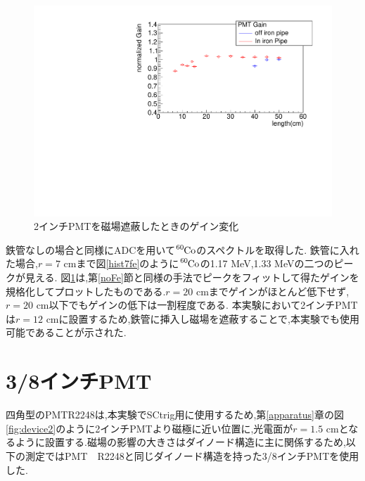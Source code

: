 \begin{figure}[tbp]
	\centering
		\includegraphics[angle=-90,width=15cm]{fig/iguchi/bigPMTfit.pdf}
	\caption{2インチPMTを磁場遮蔽したときのゲイン変化}
	\label{bigPMTfit}
\end{figure}

鉄管なしの場合と同様にADCを用いて$\ce{^{60}Co}$のスペクトルを取得した.
鉄管に入れた場合,$r=7$ cmまで図\ref{hist7fe}のように$\ce{^{60}Co}$の1.17 MeV,1.33 MeVの二つのピークが見える.
図\ref{bigPMTfit}は,第\ref{noFe}節と同様の手法でピークをフィットして得たゲインを規格化してプロットしたものである.$r=20$ cmまでゲインがほとんど低下せず,$r=20$ cm以下でもゲインの低下は一割程度である.
本実験において2インチPMTは$r=12$ cmに設置するため,鉄管に挿入し磁場を遮蔽することで,本実験でも使用可能であることが示された.


\newpage
\section{3/8インチPMT}
四角型のPMT\hspace{3pt}R2248\cite{pmtR2248}は,本実験でSCtrig用に使用するため,第\ref{apparatus}章の図\ref{fig:device2}のように2インチPMTより磁極に近い位置に,光電面が$r=1.5$ cmとなるように設置する.磁場の影響の大きさはダイノード構造に主に関係するため,以下の測定ではPMT　R2248と同じダイノード構造を持った3/8インチPMT\cite{pmtH3164-10}を使用した.

